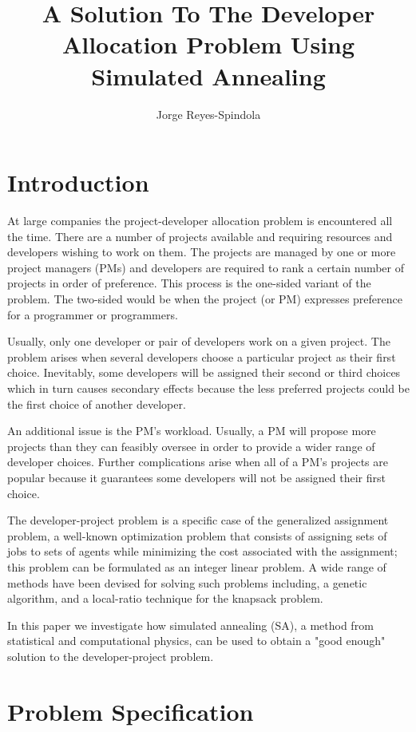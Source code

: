 \documentclass[11pt]{article}
\title{A Solution To The Developer Allocation Problem Using Simulated Annealing}
\author{Jorge Reyes-Spindola}
\begin{document}
        
    \maketitle
       
\section{Introduction}\label{introduction}

At large companies the project-developer allocation problem is
encountered all the time. There are a number of projects available and
requiring resources and developers wishing to work on them. The projects
are managed by one or more project managers (PMs) and developers are
required to rank a certain number of projects in order of preference.
This process is the one-sided variant of the problem. The two-sided
would be when the project (or PM) expresses preference for a programmer
or programmers.

Usually, only one developer or pair of developers work on a given
project. The problem arises when several developers choose a particular
project as their first choice. Inevitably, some developers will be
assigned their second or third choices which in turn causes secondary
effects because the less preferred projects could be the first choice of
another developer.

An additional issue is the PM's workload. Usually, a PM will propose
more projects than they can feasibly oversee in order to provide a wider
range of developer choices. Further complications arise when all of a
PM's projects are popular because it guarantees some developers will not
be assigned their first choice.

The developer-project problem is a specific case of the generalized
assignment problem, a well-known optimization problem that consists of
assigning sets of jobs to sets of agents while minimizing the cost
associated with the assignment; this problem can be formulated as an
integer linear problem. A wide range of methods have been devised for
solving such problems including, a genetic algorithm, and a local-ratio
technique for the knapsack problem.

In this paper we investigate how simulated annealing (SA), a method from
statistical and computational physics, can be used to obtain a "good
enough" solution to the developer-project problem.

    \section{Problem Specification}\label{problem-specification}
\end{document}
